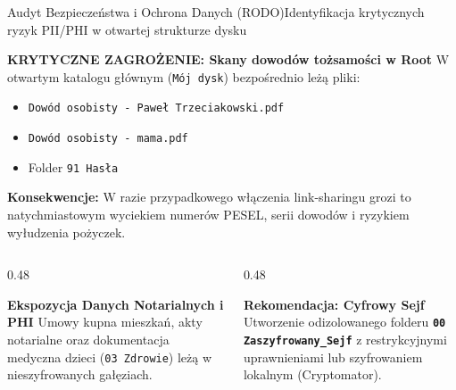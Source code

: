 \documentclass[aspectratio=169, 10pt]{beamer}
\begin{document}

\begin{frame}{Audyt Bezpieczeństwa i Ochrona Danych (RODO)}{Identyfikacja krytycznych ryzyk PII/PHI w otwartej strukturze dysku}
  \begin{alertblock}{\textbf{KRYTYCZNE ZAGROŻENIE: Skany dowodów tożsamości w Root}}
    W otwartym katalogu głównym (\texttt{Mój dysk}) bezpośrednio leżą pliki:
    \begin{itemize}
      \item \texttt{Dowód osobisty - Paweł Trzeciakowski.pdf}
      \item \texttt{Dowód osobisty - mama.pdf}
      \item Folder \texttt{91 Hasła}
    \end{itemize}
    \textbf{Konsekwencje:} W razie przypadkowego włączenia link-sharingu grozi to natychmiastowym wyciekiem numerów PESEL, serii dowodów i ryzykiem wyłudzenia pożyczek.
  \end{alertblock}

  \vspace{0.2cm}
  \begin{columns}[T]
    \begin{column}{0.48\textwidth}
      \begin{block}{\textbf{Ekspozycja Danych Notarialnych i PHI}}
        \footnotesize
        Umowy kupna mieszkań, akty notarialne oraz dokumentacja medyczna dzieci (\texttt{03 Zdrowie}) leżą w nieszyfrowanych gałęziach.
      \end{block}
    \end{column}

    \begin{column}{0.48\textwidth}
      \begin{exampleblock}{\textbf{Rekomendacja: Cyfrowy Sejf}}
        \footnotesize
        Utworzenie odizolowanego folderu \textbf{\texttt{00 Zaszyfrowany\_Sejf}} z restrykcyjnymi uprawnieniami lub szyfrowaniem lokalnym (Cryptomator).
      \end{exampleblock}
    \end{column}
  \end{columns}
\end{frame}
\end{document}
